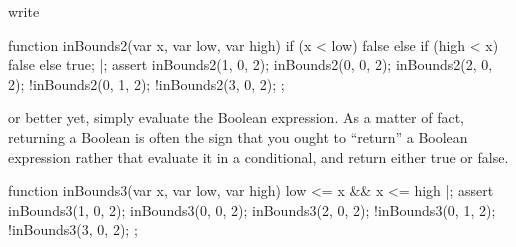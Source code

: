 \noindent
write

\begin{urbiscript}
function inBounds2(var x, var low, var high)
{
  if (x < low)
    false
  else if (high < x)
    false
  else
    true;
}|;
assert
{
  inBounds2(1, 0, 2);    inBounds2(0, 0, 2);  inBounds2(2, 0, 2);
  !inBounds2(0, 1, 2);  !inBounds2(3, 0, 2);
};
\end{urbiscript}

\noindent
or better yet, simply evaluate the Boolean expression.  As a matter of fact,
returning a Boolean is often the sign that you ought to ``return'' a Boolean
expression rather that evaluate it in a conditional, and return either true
or false.

\begin{urbiscript}
function inBounds3(var x, var low, var high)
{
  low <= x && x <= high
}|;
assert
{
  inBounds3(1, 0, 2);    inBounds3(0, 0, 2);  inBounds3(2, 0, 2);
  !inBounds3(0, 1, 2);  !inBounds3(3, 0, 2);
};
\end{urbiscript}


